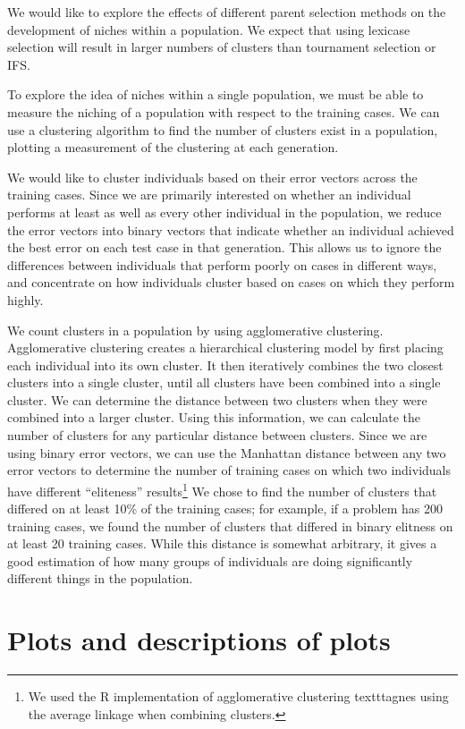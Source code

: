 We would like to explore the effects of different parent selection methods on the development of niches within a population. We expect that using lexicase selection will result in larger numbers of clusters than tournament selection or IFS.

To explore the idea of niches within a single population, we must be able to measure the niching of a population with respect to the training cases. We can use a clustering algorithm to find the number of clusters exist in a population, plotting a measurement of the clustering at each generation.

We would like to cluster individuals based on their error vectors across the training cases. Since we are primarily interested on whether an individual performs at least as well as every other individual in the population, we reduce the error vectors into binary vectors that indicate whether an individual achieved the best error on each test case in that generation. This allows us to ignore the differences between individuals that perform poorly on cases in different ways, and concentrate on how individuals cluster based on cases on which they perform highly.

We count clusters in a population by using agglomerative clustering. Agglomerative clustering creates a hierarchical clustering model by first placing each individual into its own cluster. It then iteratively combines the two closest clusters into a single cluster, until all clusters have been combined into a single cluster. We can determine the distance between two clusters when they were combined into a larger cluster. Using this information, we can calculate the number of clusters for any particular distance between clusters. Since we are using binary error vectors, we can use the Manhattan distance between any two error vectors to determine the number of training cases on which two individuals have different ``eliteness'' results\footnote{We used the R implementation of agglomerative clustering texttt{agnes} using the average linkage when combining clusters.} We chose to find the number of clusters that differed on at least 10\% of the training cases; for example, if a problem has 200 training cases, we found the number of clusters that differed in binary elitness on at least 20 training cases. While this distance is somewhat arbitrary, it gives a good estimation of how many groups of individuals are doing significantly different things in the population.


\section{Plots and descriptions of plots}

